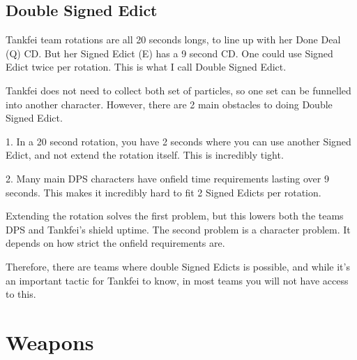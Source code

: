 \documentclass[11pt]{article}
\begin{document}


\subsection{Double Signed Edict}

Tankfei team rotations are all 20 seconds longs, to line up with her Done Deal (Q) CD. But her Signed Edict (E) has a 9 second CD. One could use Signed Edict twice per rotation. This is what I call Double Signed Edict.

Tankfei does not need to collect both set of particles, so one set can be funnelled into another character. However, there are 2 main obstacles to doing Double Signed Edict.

1. In a 20 second rotation, you have 2 seconds where you can use another Signed Edict, and not extend the rotation itself. This is incredibly tight. 

2. Many main DPS characters have onfield time requirements lasting over 9 seconds. This makes it incredibly hard to fit 2 Signed Edicts per rotation. 

Extending the rotation solves the first problem, but this lowers both the teams DPS and Tankfei's shield uptime. The second problem is a character problem. It depends on how strict the onfield requirements are. 

Therefore, there are teams where double Signed Edicts is possible, and while it's an important tactic for Tankfei to know, in most teams you will not have access to this. 

\newpage

\section{Weapons}
\end{document}

